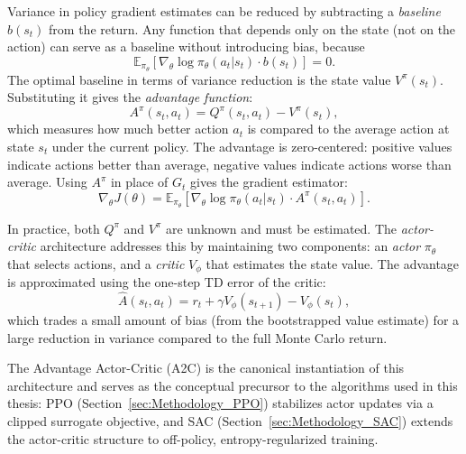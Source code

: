 Variance in policy gradient estimates can be reduced by subtracting a \emph{baseline} $b(s_t)$ from the return. Any function that depends only on the state (not on the action) can serve as a baseline without introducing bias, because
\begin{equation}
  \mathbb{E}_{\pi_\theta}\!\left[\nabla_\theta \log \pi_\theta(a_t|s_t)\cdot b(s_t)\right] = 0.
  \label{eq:baseline_zero}
\end{equation}
The optimal baseline in terms of variance reduction is the state value $V^{\pi}(s_t)$. Substituting it gives the \emph{advantage function}:
\begin{equation}
  A^{\pi}(s_t, a_t) = Q^{\pi}(s_t, a_t) - V^{\pi}(s_t),
  \label{eq:advantage}
\end{equation}
which measures how much better action $a_t$ is compared to the average action at state $s_t$ under the current policy. The advantage is zero-centered: positive values indicate actions better than average, negative values indicate actions worse than average. Using $A^{\pi}$ in place of $G_t$ gives the gradient estimator:
\begin{equation}
  \nabla_\theta J(\theta) = \mathbb{E}_{\pi_\theta}\!\left[\nabla_\theta \log \pi_\theta(a_t|s_t)\cdot A^{\pi}(s_t, a_t)\right].
\end{equation}

In practice, both $Q^{\pi}$ and $V^{\pi}$ are unknown and must be estimated. The \emph{actor-critic} architecture addresses this by maintaining two components: an \emph{actor} $\pi_\theta$ that selects actions, and a \emph{critic} $V_\phi$ that estimates the state value. The advantage is approximated using the one-step TD error of the critic:
\begin{equation}
  \hat{A}(s_t, a_t) = r_t + \gamma V_\phi(s_{t+1}) - V_\phi(s_t),
  \label{eq:td_advantage}
\end{equation}
which trades a small amount of bias (from the bootstrapped value estimate) for a large reduction in variance compared to the full Monte Carlo return.

The Advantage Actor-Critic (A2C) \citep{mnih2016asynchronous} is the canonical instantiation of this architecture and serves as the conceptual precursor to the algorithms used in this thesis: PPO (Section~\ref{sec:Methodology_PPO}) stabilizes actor updates via a clipped surrogate objective, and SAC (Section~\ref{sec:Methodology_SAC}) extends the actor-critic structure to off-policy, entropy-regularized training.

